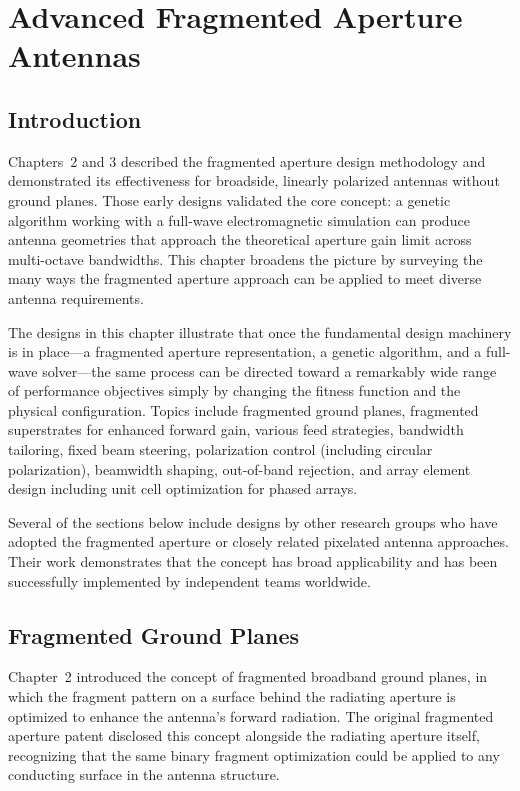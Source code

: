 \chapter{Advanced Fragmented Aperture Antennas}

\section{Introduction}

Chapters~2 and 3 described the fragmented aperture design methodology and demonstrated its effectiveness for broadside, linearly polarized antennas without ground planes.  Those early designs validated the core concept: a genetic algorithm working with a full-wave electromagnetic simulation can produce antenna geometries that approach the theoretical aperture gain limit across multi-octave bandwidths.  This chapter broadens the picture by surveying the many ways the fragmented aperture approach can be applied to meet diverse antenna requirements.

The designs in this chapter illustrate that once the fundamental design machinery is in place---a fragmented aperture representation, a genetic algorithm, and a full-wave solver---the same process can be directed toward a remarkably wide range of performance objectives simply by changing the fitness function and the physical configuration.  Topics include fragmented ground planes, fragmented superstrates for enhanced forward gain, various feed strategies, bandwidth tailoring, fixed beam steering, polarization control (including circular polarization), beamwidth shaping, out-of-band rejection, and array element design including unit cell optimization for phased arrays.

Several of the sections below include designs by other research groups who have adopted the fragmented aperture or closely related pixelated antenna approaches.  Their work demonstrates that the concept has broad applicability and has been successfully implemented by independent teams worldwide.

\section{Fragmented Ground Planes}
\label{sec:ch4gnd}

Chapter~2 introduced the concept of fragmented broadband ground planes, in which the fragment pattern on a surface behind the radiating aperture is optimized to enhance the antenna's forward radiation.  The original fragmented aperture patent \cite{MaloneyFragPatent} disclosed this concept alongside the radiating aperture itself, recognizing that the same binary fragment optimization could be applied to any conducting surface in the antenna structure.

